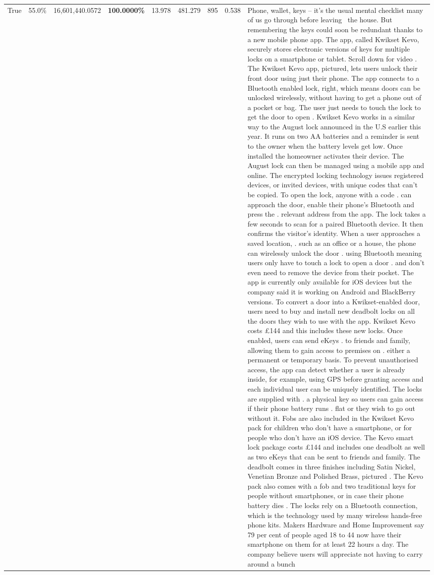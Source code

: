 \begin{table}[H]
\begin{tabular}{lllrlllll}
True & 55.0\% & 16,601,440.0572 & \bfseries \color{red} 100.0000\% & 13.978 & 481.279 & 895 & 0.538 & Phone, wallet, keys – it’s the usual mental checklist many of us go through before leaving  the house. But remembering the keys could soon be redundant thanks to a new mobile phone app. The app, called Kwikset Kevo, securely stores electronic versions of keys for multiple locks on a smartphone or tablet. Scroll down for video . The Kwikset Kevo app, pictured, lets users unlock their front door using just their phone. The app connects to a Bluetooth enabled lock, right, which means doors can be unlocked wirelessly, without having to get a phone out of a pocket or bag. The user just needs to touch the lock to get the door to open . Kwikset Kevo works in a similar way to the August lock announced in the U.S earlier this year. It runs on two AA batteries and a reminder is sent to the owner when the battery levels get low. Once installed the homeowner activates their device. The August lock can then be managed using a mobile app and online. The encrypted locking technology issues registered devices, or invited devices, with unique codes that can't be copied. To open the lock, anyone with a code . can approach the door, enable their phone's Bluetooth and press the . relevant address from the app. The lock takes a few seconds to scan for a paired Bluetooth device. It then confirms the visitor's identity. When a user approaches a saved location, . such as an office or a house, the phone can wirelessly unlock the door . using Bluetooth meaning users only have to touch a lock to open a door . and don't even need to remove the device from their pocket. The app is currently only available for iOS devices but the company said it is working on Android and BlackBerry versions. To convert a door into a Kwikset-enabled door, users need to buy and install new deadbolt locks on all the doors they wish to use with the app. Kwikset Kevo costs £144 and this includes these new locks. Once enabled, users can send eKeys . to friends and family, allowing them to gain access to premises on . either a permanent or temporary basis. To prevent unauthorised access, the app can detect whether a user is already inside, for example, using GPS before granting access and each individual user can be uniquely identified. The locks are supplied with . a physical key so users can gain access if their phone battery runs . flat or they wish to go out without it. Fobs are also included in the Kwikset Kevo pack for children who don't have a smartphone, or for people who don't have an iOS device. The Kevo smart lock package costs £144 and includes one deadbolt as well as two eKeys that can be sent to friends and family. The deadbolt comes in three finishes including Satin Nickel, Venetian Bronze and Polished Brass, pictured . The Kevo pack also comes with a fob and two traditional keys for people without smartphones, or in case their phone battery dies . The locks rely on a Bluetooth connection, which is the technology used by many wireless hands-free phone kits. Makers Hardware and Home Improvement say 79 per cent of people aged 18 to 44 now have their smartphone on them for at least 22 hours a day. The company believe users will appreciate not having to carry around a bunch 
\end{tabular}
\end{table}
